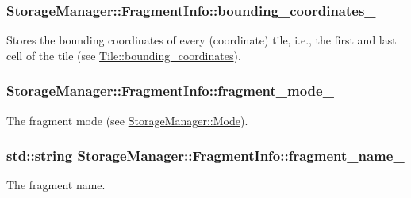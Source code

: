 \subsubsection[{bounding\+\_\+coordinates\+\_\+}]{ Storage\+Manager\+::\+Fragment\+Info\+::bounding\+\_\+coordinates\+\_\+}\label{structStorageManager_1_1FragmentInfo_aac30cfa70d7b2abf6dcfcc99e8a36403}
Stores the bounding coordinates of every (coordinate) tile, i.\+e., the first and last cell of the tile (see \hyperlink{classTile_a4f253c66ce7c9e17dc9cd67e1ed730a6}{Tile\+::bounding\+\_\+coordinates}). \hypertarget{structStorageManager_1_1FragmentInfo_aa90cf062cb0ea543bd709c48308d41e2}{}
\subsubsection[{fragment\+\_\+mode\+\_\+}]{ Storage\+Manager\+::\+Fragment\+Info\+::fragment\+\_\+mode\+\_\+}\label{structStorageManager_1_1FragmentInfo_aa90cf062cb0ea543bd709c48308d41e2}
The fragment mode (see \hyperlink{classStorageManager_a954978f012ace347debd73b2a461a618}{Storage\+Manager\+::\+Mode}). \hypertarget{structStorageManager_1_1FragmentInfo_a6e042a16573de3d5642567bc6e669ecc}{}
\subsubsection[{fragment\+\_\+name\+\_\+}]{\setlength{\rightskip}{0pt plus 5cm}std\+::string Storage\+Manager\+::\+Fragment\+Info\+::fragment\+\_\+name\+\_\+}\label{structStorageManager_1_1FragmentInfo_a6e042a16573de3d5642567bc6e669ecc}
The fragment name. \hypertarget{structStorageManager_1_1FragmentInfo_a602707f31dd459f7618a763c7fdff48c}{}

